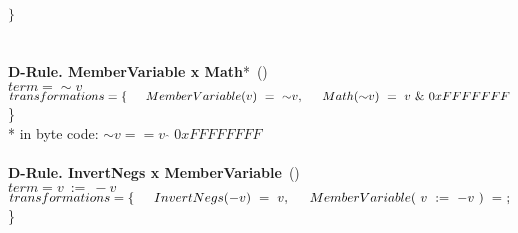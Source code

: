 $\}$\\
\\
\\
\textbf{D-Rule. MemberVariable x Math}*~(\pit{})\\
$term = {\sim}v $\\
$transformations = \{\\ 
\indent MemberVariable(v)~=~{\sim}v,\\ 
\indent Math({\sim}v)~=~v~\&~0xFFFFFFF$\\ \}\\
* in byte code: ${\sim}v == v~\hat{~}~0xFFFFFFFF$
\\
\\
\textbf{D-Rule. InvertNegs x MemberVariable}~(\pit{})\\
$term = v~:=~-v~$\\
$transformations = \{\\ 
\indent InvertNegs(-v)~=~v,\\ 
\indent MemberVariable(~v~:=~-v~)~=~;$\\\}\\
\\
\\





